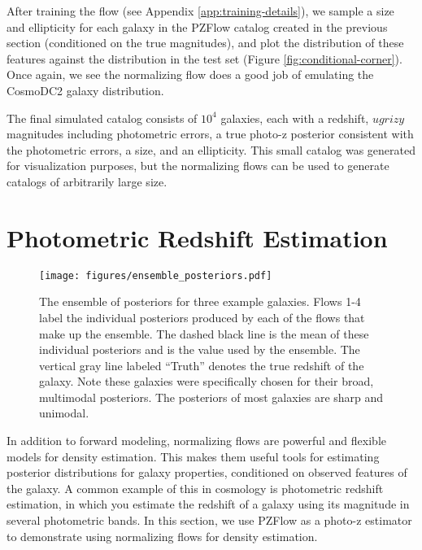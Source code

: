 \documentclass[twocolumn,twocolappendix]{aastex631}
\begin{document}
After training the flow (see Appendix \ref{app:training-details}), we sample a size and ellipticity for each galaxy in the PZFlow catalog created in the previous section (conditioned on the true magnitudes), and plot the distribution of these features against the distribution in the test set (Figure \ref{fig:conditional-corner}).
Once again, we see the normalizing flow does a good job of emulating the CosmoDC2 galaxy distribution.

The final simulated catalog consists of $10^4$ galaxies, each with a redshift, $ugrizy$ magnitudes including photometric errors, a true photo-z posterior consistent with the photometric errors, a size, and an ellipticity.
This small catalog was generated for visualization purposes, but the normalizing flows can be used to generate catalogs of arbitrarily large size.


\section{Photometric Redshift Estimation}
\label{sec:photo-z}

\begin{figure*}[t]
    \begin{centering}
        \texttt{[image: figures/ensemble\_posteriors.pdf]}
        \caption{
            The ensemble of posteriors for three example galaxies.
            Flows 1-4 label the individual posteriors produced by each of the flows that make up the ensemble.
            The dashed black line is the mean of these individual posteriors and is the value used by the ensemble.
            The vertical gray line labeled ``Truth'' denotes the true redshift of the galaxy.
            Note these galaxies were specifically chosen for their broad, multimodal posteriors.
            The posteriors of most galaxies are sharp and unimodal.
        }
        \label{fig:ensemble-posteriors}
    \end{centering}
\end{figure*}

In addition to forward modeling, normalizing flows are powerful and flexible models for density estimation.
This makes them useful tools for estimating posterior distributions for galaxy properties, conditioned on observed features of the galaxy.
A common example of this in cosmology is photometric redshift estimation, in which you estimate the redshift of a galaxy using its magnitude in several photometric bands.
In this section, we use PZFlow as a photo-z estimator to demonstrate using normalizing flows for density estimation.
\end{document}
